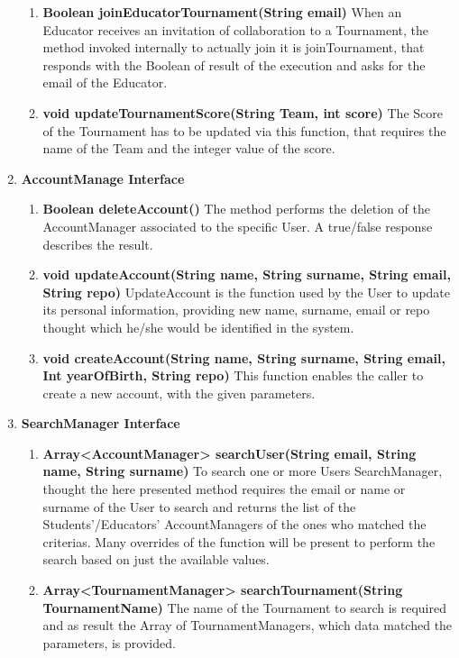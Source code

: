 \begin{enumerate}
\begin{enumerate}[label=$\bullet$]
        \item \textbf{Boolean joinEducatorTournament(String email)} When an Educator receives an invitation of collaboration to a Tournament, the method invoked internally to actually join it is joinTournament, that responds with the Boolean of result of the execution and asks for the email of the Educator.
        \item \textbf{void updateTournamentScore(String Team, int score)} The Score of the Tournament has to be updated via this function, that requires the name of the Team and the integer value of the score.
        \end{enumerate}
    \item \textbf{AccountManage Interface} 
        \begin{enumerate}[label=$\bullet$]
            \item \textbf{Boolean deleteAccount()} The method performs the deletion of the AccountManager associated to the specific User. A true/false response describes the result.
            \item \textbf{void updateAccount(String name, String surname, String email, String repo)} UpdateAccount is the function used by the User to update its personal information, providing new name, surname, email or repo thought which he/she would be identified in the system.
            \item \textbf{void createAccount(String name, String surname, String email, Int yearOfBirth, String repo)} This function enables the caller to create a new account, with the given parameters.
        \end{enumerate}
    \item \textbf{SearchManager Interface} 
        \begin{enumerate}[label=$\bullet$]
            \item \textbf{Array<AccountManager> searchUser(String email, String name, String surname)} To search one or more Users SearchManager, thought the here presented method requires the email or name or surname of the User to search and returns the list of the Students'/Educators' AccountManagers of the ones who matched the criterias. Many overrides of the function will be present to perform the search based on just the available values.
            \item \textbf{Array<TournamentManager> searchTournament(String TournamentName)} The name of the Tournament to search is required and as result the Array of TournamentManagers, which data matched the parameters, is provided.
        \end{enumerate}
\end{enumerate}
